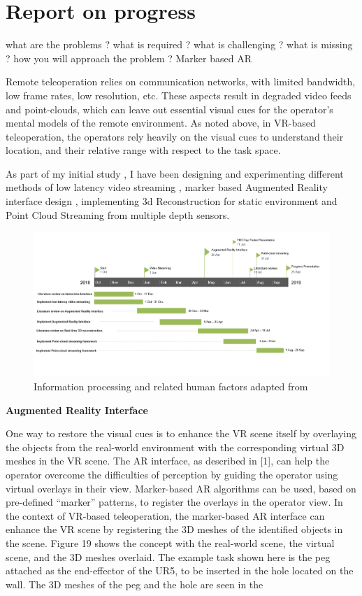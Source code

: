 \section{Report on progress}

what are the problems ?
what is required ?
what is challenging ?
what is missing ?
how you will approach the problem ?
Marker based AR 

Remote  teleoperation  relies  on  communication  networks,  with  limited  bandwidth,  low  frame  rates,  low  resolution,  etc.  These  aspects  result  in  degraded  video  feeds  and  point-clouds,  which  can  leave  out essential visual cues for the operator’s mental models of the remote environment. As noted above, in VR-based teleoperation, the operators rely heavily on the visual cues to understand their location, and their relative range with respect to the task space. 

As part of my initial study , I have been designing and experimenting different methods of low latency video streaming , marker based Augmented Reality interface design , implementing 3d Reconstruction for static environment and Point Cloud Streaming from multiple depth sensors.

\begin{figure}
     \includegraphics[width=1\textwidth]{images/GantChart.PNG}
    \caption{Information processing and related human factors adapted from \cite{PMID:11540969}}
    \centering
    \label{Info Processing}
\end{figure}

\textbf{Augmented Reality Interface}

One way to restore the visual cues is to enhance the VR scene itself by overlaying the objects from the real-world environment with the corresponding virtual 3D meshes in the VR scene. The AR interface, as  described  in  [1],  can  help  the  operator  overcome  the  difficulties  of  perception  by  guiding  the  operator using virtual overlays in their view. Marker-based AR algorithms can be used, based on pre-defined “marker” patterns, to register the overlays in the operator view. In the context of VR-based teleoperation, the marker-based AR interface can enhance the VR scene by registering the 3D meshes of the identified objects in the scene. Figure 19 shows the concept with the real-world scene, the virtual scene,  and  the  3D  meshes  overlaid.  The  example  task  shown  here  is  the  peg  attached  as  the  end-effector of the UR5, to be inserted in the hole located on the wall. The 3D meshes of the peg and the hole are seen in the 



